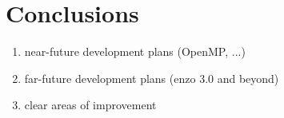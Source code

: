 
\section{Conclusions}

\begin{enumerate}
\item near-future development plans (OpenMP, ...)
\item far-future development plans (enzo 3.0 and beyond)
\item clear areas of improvement
\end{enumerate}

